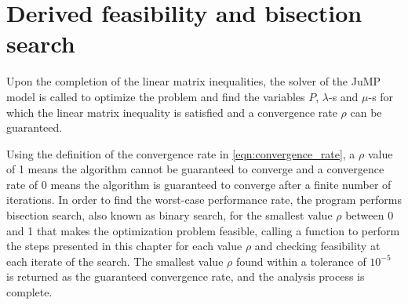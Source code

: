\section{Derived feasibility and bisection search}
Upon the completion of the linear matrix inequalities, the solver of the JuMP model is called to optimize the problem and find the variables \texttt{$P$}, \texttt{$\lambda$}-s and \texttt{$\mu$}-s for which the linear matrix inequality is satisfied and a convergence rate $\rho$ can be guaranteed.

Using the definition of the convergence rate in \eqref{eqn:convergence_rate}, a \texttt{$\rho$} value of 1 means the algorithm cannot be guaranteed to converge and a convergence rate of 0 means the algorithm is guaranteed to converge after a finite number of iterations. In order to find the worst-case performance rate, the program performs bisection search, also known as binary search, for the smallest value $\rho$ between 0 and 1 that makes the optimization problem feasible, calling a function to perform the steps presented in this chapter for each value \texttt{$\rho$} and checking feasibility at each iterate of the search. The smallest value \texttt{$\rho$} found within a tolerance of $10^{-5}$ is returned as the guaranteed convergence rate, and the analysis process is complete.